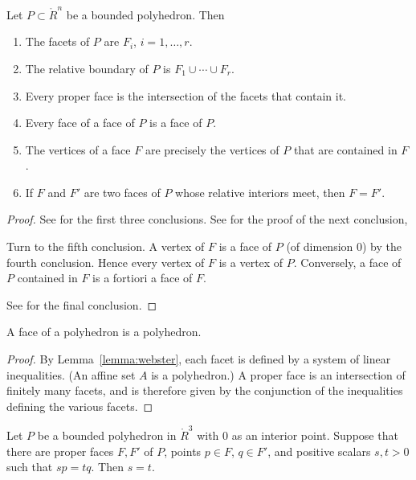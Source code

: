 \begin{lemma}\label{lemma:webster}  
Let $P\subset\ring{R}^n$ be a bounded polyhedron.  Then
\begin{enumerate}
\item The facets of $P$ are $F_i$, $i=1,\ldots,r$.
\item The relative boundary of $P$ is $F_1\cup\cdots \cup F_r$.
\item Every proper face is the intersection of the facets that contain it.
\item Every face of a face of $P$ is a face of $P$.
\item The vertices of a face $F$ are precisely the vertices of $P$ that are contained in $F$.
\item If $F$ and $F'$ are two faces of $P$ whose relative interiors meet, then
$F=F'$.
\end{enumerate}
\end{lemma}

\begin{proof} See \cite[Thm~3.2.1]{webster:1994} for the first three conclusions.
See \cite[Th~2.6.5]{webster:1994} for the proof of the next conclusion,

Turn to the fifth conclusion.  A vertex of $F$ is a face of $P$ (of dimension $0$) by the fourth conclusion.  Hence every vertex of $F$ is a vertex of $P$.  Conversely, a face of $P$ contained in $F$ is a fortiori a face of $F$.

See \cite[Cor~2.6.7]{webster:1994} for the final conclusion.
\end{proof}

\begin{corollary}
A face of a polyhedron is a polyhedron.  
\end{corollary}

\begin{proof} By Lemma~\ref{lemma:webster}, each facet is defined by a system of linear inequalities.  (An affine set $A$ is a polyhedron.)  A proper face is an intersection of finitely many facets, and is therefore given by the conjunction of the inequalities defining the various facets.
\end{proof}


\begin{lemma} \label{lemma:scale} 
Let $P$ be a bounded polyhedron in $\ring{R}^3$ with $0$ as an interior point.  Suppose that there are proper faces $F,F'$ of $P$, points $p\in F$, $q\in F'$, and positive scalars $s,t >0$ such that $s p = t q$.  Then $s=t$.
\end{lemma}

